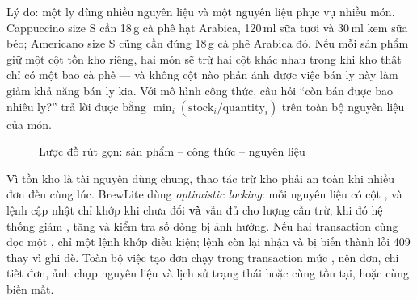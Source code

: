 ﻿\documentclass[12pt,a4paper]{article}
\begin{document}
Lý do: một ly dùng nhiều nguyên liệu và một nguyên liệu phục vụ nhiều món. Cappuccino size S cần
18\,g cà phê hạt Arabica, 120\,ml sữa tươi và 30\,ml kem sữa béo; Americano size S cũng cần đúng
18\,g cà phê Arabica đó. Nếu mỗi sản phẩm giữ một cột tồn kho riêng, hai món sẽ trừ hai cột khác
nhau trong khi kho thật chỉ có một bao cà phê --- và không cột nào phản ánh được việc bán ly này làm
giảm khả năng bán ly kia. Với mô hình công thức, câu hỏi ``còn bán được bao nhiêu ly?'' trả lời được
bằng $\min_i (\text{stock}_i / \text{quantity}_i)$ trên toàn bộ nguyên liệu của món.

\begin{figure}[t]
\centering
{}
\caption{Lược đồ rút gọn: sản phẩm -- công thức -- nguyên liệu}
\label{fig:erd}
\end{figure}

Vì tồn kho là tài nguyên dùng chung, thao tác trừ kho phải an toàn khi nhiều đơn đến cùng lúc.
BrewLite dùng \emph{optimistic locking}: mỗi nguyên liệu có cột , và lệnh cập nhật chỉ
khớp khi  chưa đổi \textbf{và}  vẫn đủ cho lượng cần trừ; khi đó hệ thống
giảm , tăng  và kiểm tra số dòng bị ảnh hưởng. Nếu hai transaction cùng đọc
một , chỉ một lệnh khớp điều kiện; lệnh còn lại nhận  và bị biến thành
lỗi 409 thay vì ghi đè. Toàn bộ việc tạo đơn chạy trong transaction mức , nên đơn,
chi tiết đơn, ảnh chụp nguyên liệu và lịch sử trạng thái hoặc cùng tồn tại, hoặc cùng biến mất.
\end{document}
